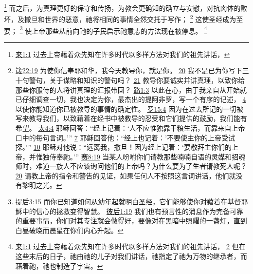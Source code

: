\documentclass[12pt, a4paper, oneside]{ctexart}
\begin{document}
	\footnote {
		\href{https://biblehub.com/hebrews/1-1.htm}{来1:1} 过去上帝藉着众先知在许多时代以多样方法对我们的祖先讲话，
	}
	而之后，为真理更好的保守和传扬，为教会更确知的确立与安慰，对抗肉体的败坏，及撒旦和世界的恶意，祂将相同的事情全然交托于写作；
	\footnote {
		\href{https://biblehub.com/proverbs/22-19.htm}{箴22:19} 为使你信奉耶和华，我今天教导你，就是你。
		\href{https://biblehub.com/proverbs/22-20.htm}{20} 我不是已为你写下三十句警句，关于谋略和知识的警句吗？
		\href{https://biblehub.com/proverbs/22-21.htm}{21} 教导你要诚实并讲真理，以致你给那些你服侍的人将讲真理的汇报带回？ 
		\href{https://biblehub.com/luke/1-3.htm}{路1:3} 以此在心，由于我亲自从开始就已仔细调查一切，我也决定为你，最杰出的提阿非罗，写一个有序的记述，
		\href{https://biblehub.com/luke/1-4.htm}{4} 以使你能知道你已被教导的事情的确定性。
		\href{https://biblehub.com/romans/15-4.htm}{罗15:4} 因为在过去所记的一切被写来教导我们，以致藉着在经书中被教导的忍受和它们提供的鼓励，我们能有希望。
		\href{https://biblehub.com/matthew/4-4.htm}{太4:4} 耶稣回答：“经上记着：‘人不应惟独靠干粮生活，而靠来自上帝口中的每句言词。’” 
		\href{https://biblehub.com/matthew/4-7.htm}{7} 耶稣回答他：“经上也记着：'不要使主你的上帝受试探。’”
		\href{https://biblehub.com/matthew/4-10.htm}{10} 耶稣对他说：“远离我，撒旦！因为经上记着：‘要敬拜主你们的上帝，并惟独侍奉祂。’”
		\href{https://biblehub.com/isaiah/8-19.htm}{赛8:19} 当某人吩咐你们请教那些喃喃自语的灵媒和招魂师时，难道一族人不应该询问他们的上帝吗？为什么要为了生者请教死人呢？
		\href{https://biblehub.com/isaiah/8-20.htm}{20} 请教上帝的指令和警告的见证，如果任何人不按照这言词讲话，他们就没有黎明之光。
	}
	这使圣经成为至要；
	\footnote {
		\href{https://biblehub.com/2_timothy/3-15.htm}{提后3:15} 而你已知道如何从幼年起就明白圣经，它们能够使你对藉着在基督耶稣中的信心的拯救变得智慧。
		\href{https://biblehub.com/2_peter/1-19.htm}{彼后1:19} 我们也有预言性的消息作为完备可靠的重要事情，你们对其专注就会做得好，要像对在黑暗中照耀的一盏灯，直到白昼破晓而晨星在你们内心升起。
	}
	使上帝那些从前向祂的子民启示祂意志的方法现在被停息。
	\footnote {
		\href{https://biblehub.com/hebrews/1-1.htm}{来1:1} 过去上帝藉着众先知在许多时代以多样方法对我们的祖先讲话，
		\href{https://biblehub.com/hebrews/1-2.htm}{2} 但在这些末后的日子，祂由祂的儿子对我们讲话，祂指定了祂为万物的继承者，而藉着祂，祂也制造了宇宙。
	}
\end{document}
